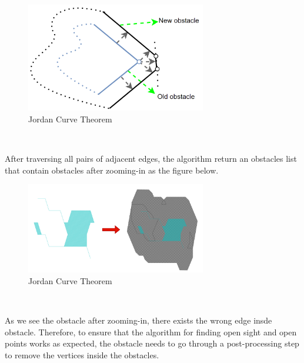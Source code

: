 \documentclass[13pt,a4paper]{article}
\begin{document}
\begin{itemize}
\begin{itemize}
\begin{itemize}
						\begin{figure}[!h]
							\centering                                 \includegraphics[width=0.7\textwidth]{Robot_Global_Vision_Update/RGVU_fconfig_loi.png}
							\caption{Jordan Curve Theorem}
						\end{figure} \\
					\end{itemize}
				
					After traversing all pairs of adjacent edges, the algorithm return an obstacles list that contain obstacles after zooming-in as the figure below. \\
					\begin{figure}[!h]
						\centering                                 \includegraphics[width=0.7\textwidth]{Robot_Global_Vision_Update/RGVU_fconfig_result.png}
						\caption{Jordan Curve Theorem}
					\end{figure} \\
					
				\end{itemize}
				As we see the obstacle after zooming-in, there exists the wrong edge insde obstacle. Therefore, to ensure that the algorithm for finding open sight and open points works as expected, the obstacle needs to go through a post-processing step to remove the vertices inside the obstacles.
				

\end{itemize}
\end{document}
